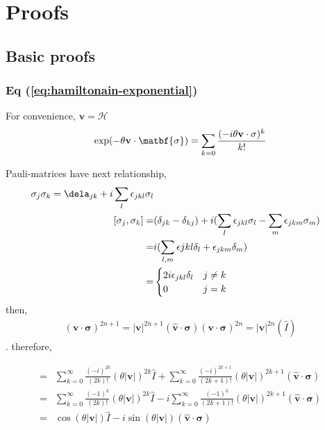 \chapter{Proofs}

\section{Basic proofs}

\subsection{Eq (\ref{eq:hamiltonain-exponential})}
\label{AppendixProof01}

For convenience, $\mathbf{v} = \mathcal{H}$
\begin{equation}
    \exp(- \theta \mathbf{v} \cdot \matbf{\sigma}) = \sum_{k=0} \frac{(-i\theta \mathbf{v} \cdot \mathbf{\sigma})^k}{k!} \\
\end{equation}

Pauli-matrices have next relationship,
\begin{align}
    \sigma_j \sigma_k = \dela_{jk}  + i\sum_{l} \epsilon_{jkl}\sigma_l \\
    [\sigma_j, \sigma_k] =& (\delta_{jk} - \delta_{kj}) + i (\sum_{l} \epsilon_{jkl}\sigma_l - \sum_{m} \epsilon_{jkm}\sigma_m)\\
     =& i (\sum_{l, m} \epsilon{jkl} \delta_l + \epsilon_{jkm} \delta_m)\\
     = & \begin{cases}
        2 i \epsilon_{jkl}\delta_l & j \neq k \\
        0 & j=k
     \end{cases}
\end{align}
then,
\begin{align}
    (\mathbf{v} \cdot \mathbf{\sigma})^{2n +1} = |\mathbf{v}|^{2n+1} (\hat{\mathbf{v}} \cdot \mathbf{\sigma})
    (\mathbf{v} \cdot \mathbf{\sigma})^{2n} = |\mathbf{v}|^{2n} (\hat{I})
\end{align}.
therefore,

\begin{align}
    =& \sum_{k=0}^\infty \frac{(-i)^{2k}}{(2k)!} (\theta |\mathbf{v}|)^{2k} \hat{I} + \sum_{k=0}^\infty \frac{(-i)^{2k+1}}{(2k+1)!} (\theta |\mathbf{v}|)^{2k+1} (\hat{\mathbf{v}} \cdot \mathbf{\sigma})\\
    =& \sum_{k=0}^\infty \frac{(-1)^{k}}{(2k)!} (\theta |\mathbf{v}|)^{2k} \hat{I} -i \sum_{k=0}^\infty \frac{(-1)^{k}}{(2k+1)!} (\theta |\mathbf{v}|)^{2k+1} (\hat{\mathbf{v}} \cdot \mathbf{\sigma}) \\
    = & \cos(\theta |\mathbf{v}|) \hat{I} - i \sin(\theta |\mathbf{v}|) (\hat{\mathbf{v}} \cdot \mathbf{\sigma})
\end{align}